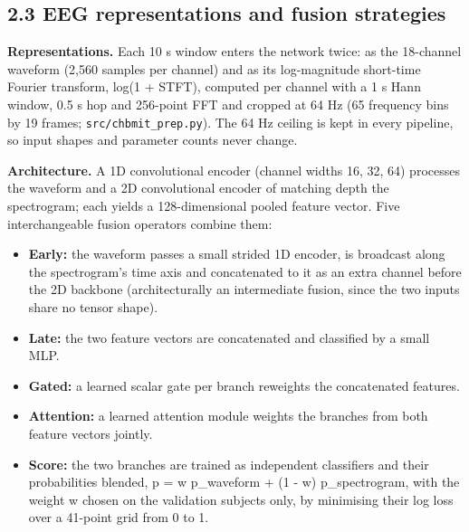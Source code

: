 \documentclass[11pt,a4paper]{article}
\providecommand{\tightlist}{%
  \setlength{\itemsep}{0pt}\setlength{\parskip}{0pt}}
\begin{document}
\subsection{2.3 EEG representations and fusion strategies}\label{eeg-representations-and-fusion-strategies}

\textbf{Representations.} Each 10 s window enters the network twice: as the 18-channel
waveform (2,560 samples per channel) and as its log-magnitude short-time Fourier
transform, log(1 + \textbar STFT\textbar), computed per channel with a 1 s Hann window, 0.5 s hop and
256-point FFT and cropped at 64 Hz (65 frequency bins by 19 frames;
\nolinkurl{src/chbmit_prep.py}). The 64 Hz ceiling is kept in every pipeline, so input shapes and
parameter counts never change.

\textbf{Architecture.} A 1D convolutional encoder (channel widths 16, 32, 64) processes the
waveform and a 2D convolutional encoder of matching depth the spectrogram; each yields
a 128-dimensional pooled feature vector. Five interchangeable fusion operators combine
them:

\begin{itemize}
\tightlist
\item
  \textbf{Early:} the waveform passes a small strided 1D encoder, is broadcast along the
  spectrogram's time axis and concatenated to it as an extra channel before the 2D
  backbone (architecturally an intermediate fusion, since the two inputs share no
  tensor shape).
\item
  \textbf{Late:} the two feature vectors are concatenated and classified by a small MLP.
\item
  \textbf{Gated:} a learned scalar gate per branch reweights the concatenated features.
\item
  \textbf{Attention:} a learned attention module weights the branches from both feature
  vectors jointly.
\item
  \textbf{Score:} the two branches are trained as independent classifiers and their
  probabilities blended, p = w p\_waveform + (1 - w) p\_spectrogram, with the weight w
  chosen on the validation subjects only, by minimising their log loss over a 41-point
  grid from 0 to 1.
\end{itemize}
\end{document}

